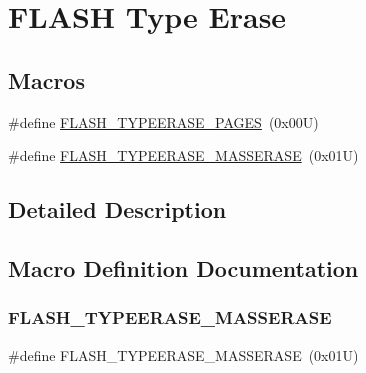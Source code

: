\hypertarget{group___f_l_a_s_h_ex___type___erase}{}\section{F\+L\+A\+SH Type Erase}
\label{group___f_l_a_s_h_ex___type___erase}
\subsection*{Macros}
\begin{DoxyCompactItemize}
\item 
\#define \hyperlink{group___f_l_a_s_h_ex___type___erase_ga3664ce55155ec4990873c51737d787ce}{F\+L\+A\+S\+H\+\_\+\+T\+Y\+P\+E\+E\+R\+A\+S\+E\+\_\+\+P\+A\+G\+ES}~(0x00\+U)
\item 
\#define \hyperlink{group___f_l_a_s_h_ex___type___erase_ga9bc03534e69c625e1b4f0f05c3852243}{F\+L\+A\+S\+H\+\_\+\+T\+Y\+P\+E\+E\+R\+A\+S\+E\+\_\+\+M\+A\+S\+S\+E\+R\+A\+SE}~(0x01\+U)
\end{DoxyCompactItemize}


\subsection{Detailed Description}


\subsection{Macro Definition Documentation}
\mbox{\label{group___f_l_a_s_h_ex___type___erase_ga9bc03534e69c625e1b4f0f05c3852243}} 
\subsubsection{\texorpdfstring{F\+L\+A\+S\+H\+\_\+\+T\+Y\+P\+E\+E\+R\+A\+S\+E\+\_\+\+M\+A\+S\+S\+E\+R\+A\+SE}{FLASH\_TYPEERASE\_MASSERASE}}
{\footnotesize\ttfamily \#define F\+L\+A\+S\+H\+\_\+\+T\+Y\+P\+E\+E\+R\+A\+S\+E\+\_\+\+M\+A\+S\+S\+E\+R\+A\+SE~(0x01\+U)}

